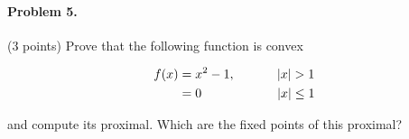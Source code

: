 \documentclass[12pt]{scrartcl}
\begin{document}

\begin{boxF}
\paragraph*{Problem 5.} (3 points) \hspace{0.15em} Prove that the following function is convex

    \begin{align*}
        f(x) &= x^2 -1, \hspace{3.3em} |x| > 1 \\
             &= 0       \hspace{6em} |x| \leq 1
    \end{align*}

and compute its proximal. Which are the fixed points of this proximal?
\end{boxF}



\vspace{1em}
\end{document}
